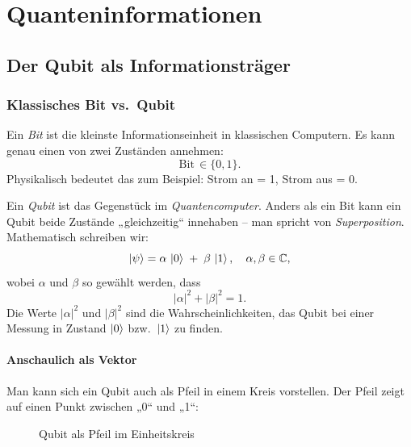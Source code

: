 \chapter{Quanteninformationen}
\label{qbits} %



\section{Der Qubit als Informationsträger}
\subsection{Klassisches Bit vs.\ Qubit}
Ein \emph{Bit} ist die kleinste Informationseinheit in klassischen Computern. Es kann genau einen von zwei Zuständen annehmen:
\[
\text{Bit}\,\in\{0,1\}.
\]
Physikalisch bedeutet das zum Beispiel: Strom an = 1, Strom aus = 0.

Ein \emph{Qubit} ist das Gegenstück im \emph{Quantencomputer}. Anders als ein Bit kann ein Qubit beide Zustände „gleichzeitig“ innehaben – man spricht von \emph{Superposition}. Mathematisch schreiben wir:
\[
\ket{\psi} = \alpha\,\ket{0} \;+\; \beta\,\ket{1}, \quad \alpha, \beta \in \mathbb{C},
\]
wobei \(\alpha\) und \(\beta\) so gewählt werden, dass
\[
|\alpha|^2 + |\beta|^2 = 1.
\]
Die Werte \(|\alpha|^2\) und \(|\beta|^2\) sind die Wahrscheinlichkeiten, das Qubit bei einer Messung in Zustand \(\ket{0}\) bzw.\ \(\ket{1}\) zu finden.

\subsubsection*{Anschaulich als Vektor}
Man kann sich ein Qubit auch als Pfeil in einem Kreis vorstellen. Der Pfeil zeigt auf einen Punkt zwischen „0“ und „1“:

\begin{figure}[H]
  \centering
  \caption{Qubit als Pfeil im Einheitskreis}
\end{figure}

